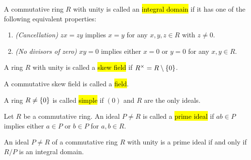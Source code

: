 \vspace{1mm}

\begin{definition}
	A commutative ring $R$ with unity is called an \hl{integral domain} if it has one of the following equivalent properties:

	\begin{enumerate}[label = \textup{(}\roman*\textup{)}]
		\item \emph{(Cancellation)} $zx = zy$ implies $x = y$ for any $x,y,z \in R$ with $z \neq 0$.
		\item \emph{(No divisors of zero)} $xy = 0$ implies either $x = 0$ or $y = 0$ for any $x,y \in R$.
	\end{enumerate}
\end{definition}

\vspace{1mm}

\begin{definition}
	A ring $R$ with unity is called a \hl{skew field} if $R^\times = R\setminus\cbr[0]{0}$.
\end{definition}

\vspace{1mm}

\begin{definition}
	A commutative skew field is called a \hl{field}.
\end{definition}

\vspace{1mm}

\begin{definition}
	A ring $R \neq \cbr[0]{0}$ is called \hl{simple} if $(0)$ and $R$ are the only ideals.
\end{definition}

\vspace{1mm}

\begin{definition}
	Let $R$ be a commutative ring. An ideal $P \neq R$ is called a \hl{prime ideal} if $ab \in P$ implies either $a \in P$ or $b \in P$ for $a,b \in R$.
\end{definition}

\vspace{1mm}

\begin{lemma}
	An ideal $P \neq R$ of a commutative ring $R$ with unity is a prime ideal if and only if $R/P$ is an integral domain.
\end{lemma}

\vspace{1mm}

